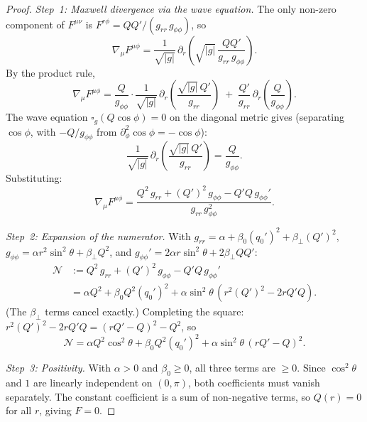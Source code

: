 \documentclass[pdflatex,sn-mathphys-num]{sn-jnl}
\theoremstyle{thmstyleone}%
\theoremstyle{thmstyletwo}%
\theoremstyle{thmstylethree}%
\newcommand{\pa}{\partial}
\newcommand{\nn}{\nabla}
\numberwithin{equation}{section}
\begin{document}
\begin{proof}
\emph{Step~1: Maxwell divergence via the wave equation.}
The only non-zero component of $F^{\mu\nu}$ is
$F^{r\phi} = QQ'/(g_{rr}\,g_{\phi\phi})$, so
\begin{equation}
\label{eq:div-F-explicit}
\nn_\mu F^{\mu\phi}
= \frac{1}{\sqrt{|g|}}\,\pa_r\!\left(
    \sqrt{|g|}\,\frac{QQ'}{g_{rr}\,g_{\phi\phi}}
  \right).
\end{equation}
By the product rule,
\begin{equation}
\label{eq:maxwell-product-rule}
\nn_\mu F^{\mu\phi}
= \frac{Q}{g_{\phi\phi}}\cdot
  \frac{1}{\sqrt{|g|}}\,\pa_r\!\left(
    \frac{\sqrt{|g|}\,Q'}{g_{rr}}
  \right)
\;+\; \frac{Q'}{g_{rr}}\,\pa_r\!\left(
    \frac{Q}{g_{\phi\phi}}
  \right).
\end{equation}
The wave equation $\square_g(Q\cos\phi) = 0$ on the diagonal metric
gives (separating $\cos\phi$, with $-Q/g_{\phi\phi}$ from
$\pa_\phi^2\cos\phi = -\cos\phi$):
\begin{equation}
\label{eq:wave-Q}
\frac{1}{\sqrt{|g|}}\,\pa_r\!\left(
  \frac{\sqrt{|g|}\,Q'}{g_{rr}}\right)
= \frac{Q}{g_{\phi\phi}}.
\end{equation}
Substituting:
\begin{equation}
\label{eq:maxwell-after-wave}
\nn_\mu F^{\mu\phi}
= \frac{Q^2\,g_{rr} + (Q')^2\,g_{\phi\phi}
        - Q'Q\,g_{\phi\phi}'}
       {g_{rr}\,g_{\phi\phi}^2}.
\end{equation}

\medskip
\emph{Step~2: Expansion of the numerator.}
With $g_{rr} = \alpha + \beta_0(q_0')^2 + \beta_\perp(Q')^2$,
$g_{\phi\phi} = \alpha r^2\sin^2\!\theta + \beta_\perp Q^2$,
and $g_{\phi\phi}' = 2\alpha r\sin^2\!\theta + 2\beta_\perp QQ'$:
\begin{align*}
\mathcal{N}
&:= Q^2\,g_{rr} + (Q')^2\,g_{\phi\phi} - Q'Q\,g_{\phi\phi}' \\
&= \alpha Q^2 + \beta_0 Q^2(q_0')^2
   + \alpha\sin^2\!\theta\,
     (r^2(Q')^2 - 2rQ'Q).
\end{align*}
(The $\beta_\perp$ terms cancel exactly.)
Completing the square:
$r^2(Q')^2 - 2rQ'Q = (rQ'-Q)^2 - Q^2$, so
\begin{equation*}
\mathcal{N}
= \alpha Q^2\cos^2\!\theta + \beta_0 Q^2(q_0')^2
  + \alpha\sin^2\!\theta\,(rQ'-Q)^2.
\end{equation*}

\medskip
\emph{Step~3: Positivity.}
With $\alpha > 0$ and $\beta_0 \ge 0$, all three terms are
$\ge 0$.  Since $\cos^2\!\theta$ and $1$ are linearly independent
on $(0,\pi)$, both coefficients must vanish separately.
The constant coefficient is a sum of non-negative terms, so
$Q(r) = 0$ for all $r$, giving $F = 0$.
\end{proof}
\end{document}
